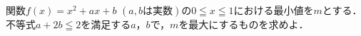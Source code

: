 \documentclass[../../main.tex]{subfiles}
\begin{document}
関数$f(x)=x^2+ax+b$ $(a,b\text{は実数})$の$0 \leqq x \leqq 1$における最小値を$m$とする．
不等式$a+2b\leqq2$を満足する$a$，$b$で，$m$を最大にするものを求めよ．
\end{document}
